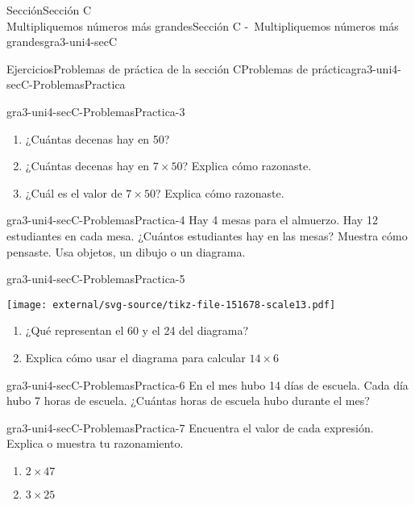 \begin{sectionptx}{Sección}{{\Large Sección C\\}Multipliquemos números más grandes}{}{Sección C -~Multipliquemos números más grandes}{}{}{gra3-uni4-secC}
\begin{exercises-subsection}{Ejercicios}{Problemas de práctica de la sección C}{}{Problemas de práctica}{}{}{gra3-uni4-secC-ProblemasPractica}
\begin{divisionexercise}{1}{}{}{gra3-uni4-secC-ProblemasPractica-3}
%
\begin{enumerate}[label={(\alph*)}]
\item{}¿Cuántas decenas hay en 50?%
\item{}¿Cuántas decenas hay en \(7 \times 50\)? Explica cómo razonaste.%
\item{}¿Cuál es el valor de \(7 \times 50\)? Explica cómo razonaste.%
\end{enumerate}
\end{divisionexercise}%
\begin{divisionexercise}{2}{}{}{gra3-uni4-secC-ProblemasPractica-4}%
Hay 4 mesas para el almuerzo. Hay 12 estudiantes en cada mesa. ¿Cuántos estudiantes hay en las mesas? Muestra cómo pensaste. Usa objetos, un dibujo o un diagrama.%
\end{divisionexercise}%
\begin{divisionexercise}{3}{}{}{gra3-uni4-secC-ProblemasPractica-5}%
\begin{sidebyside}{2}{0.0125}{0.0125}{0.025}%
\begin{sbspanel}{0.35}%
\texttt{[image: external/svg-source/tikz-file-151678-scale13.pdf]}
\end{sbspanel}%
\begin{sbspanel}{0.6}%
%
\begin{enumerate}[label={(\alph*)}]
\item{}¿Qué representan el 60 y el 24 del diagrama?%
\item{}Explica cómo usar el diagrama para calcular \(14 \times 6\)%
\end{enumerate}
\end{sbspanel}%
\end{sidebyside}%
\end{divisionexercise}%
\begin{divisionexercise}{4}{}{}{gra3-uni4-secC-ProblemasPractica-6}%
En el mes hubo 14 días de escuela. Cada día hubo 7 horas de escuela. ¿Cuántas horas de escuela hubo durante el mes?%
\end{divisionexercise}%
\begin{divisionexercise}{5}{}{}{gra3-uni4-secC-ProblemasPractica-7}%
Encuentra el valor de cada expresión. Explica o muestra tu razonamiento.%
%
\begin{enumerate}[label={(\alph*)}]
\item{}\(\displaystyle 2 \times 47\)%
\item{}\(\displaystyle 3 \times 25\)%
\end{enumerate}
\end{divisionexercise}%

\end{exercises-subsection}
\end{sectionptx}
